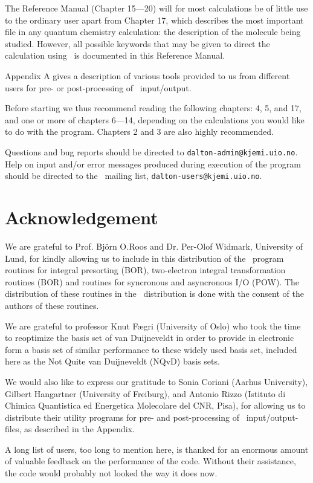 \begin{description}
\item The Reference Manual (Chapter 15---20) will for most calculations be of
little use to the ordinary user apart from Chapter 17, which describes
the most important file in any quantum chemistry calculation: the
description of the molecule being studied. However, all possible
keywords that may be given to direct the calculation using \siraba\ is
documented in this Reference Manual.

\item Appendix A gives a description of various tools provided to us
from different users for pre- or post-processing of \siraba\
input/output.
\end{description}

Before starting we thus recommend reading
the following chapters: 4, 5, and 17, and one or more of chapters
6---14, depending on the
calculations you would like to do with the program. Chapters
2 and 3 are also highly recommended.

Questions and bug reports should be directed to
\verb|dalton-admin@kjemi.uio.no|. Help on input and/or error messages
produced during execution of the program should be directed to the
\siraba\ mailing list\index{mailing list}, \verb|dalton-users@kjemi.uio.no|.

\section{Acknowledgement}

We are grateful to Prof. Bj\"{o}rn O.Roos and Dr. Per-Olof
Widmark, University of Lund, for kindly allowing us to include in
this distribution of the \siraba\ program routines for integral
presorting (BOR), two-electron integral
transformation routines\index{integral transformation} (BOR) and
routines for syncronous and asyncronous I/O (POW). The
distribution of these routines in the \siraba\ distribution is
done with the consent of the authors of these routines.

We are grateful to professor Knut F\ae gri (University of Oslo) who
took the time to reoptimize the basis set of van Duijneveldt in order
to provide in electronic form a basis set of similar performance to
these widely used basis set, included here as the Not Quite van
Duijneveldt (NQvD) basis sets.

We would also like to express our gratitude to Sonia Coriani (Aarhus
University), Gilbert Hangartner (University of Freiburg), and Antonio
Rizzo (Istituto di Chimica Quantistica ed Energetica Molecolare del
CNR, Pisa), for allowing us to distribute their utility programs for
pre- and post-processing of \siraba\ input/output-files, as described
in the Appendix.

A long list of users, too long to mention here, is thanked for an
enormous amount of valuable feedback on the performance of the
code. Without their assistance, the code would probably not looked the
way it does now.
